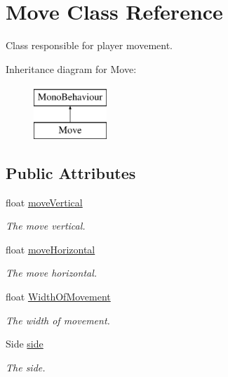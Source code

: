 \hypertarget{class_move}{}\section{Move Class Reference}
\label{class_move}


Class responsible for player movement.  


Inheritance diagram for Move\+:\begin{figure}[H]
\begin{center}
\leavevmode
\includegraphics[height=2.000000cm]{class_move}
\end{center}
\end{figure}
\subsection*{Public Attributes}
\begin{DoxyCompactItemize}
\item 
float \mbox{\hyperlink{class_move_a248dd0919f2777f32c019ca10c342629}{move\+Vertical}}
\begin{DoxyCompactList}\small\item\em The move vertical. \end{DoxyCompactList}\item 
float \mbox{\hyperlink{class_move_a2777ede3b7fbfd425deb04fe8fd69791}{move\+Horizontal}}
\begin{DoxyCompactList}\small\item\em The move horizontal. \end{DoxyCompactList}\item 
float \mbox{\hyperlink{class_move_a564c70756027d119d684db3edfede659}{Width\+Of\+Movement}}
\begin{DoxyCompactList}\small\item\em The width of movement. \end{DoxyCompactList}\item 
Side \mbox{\hyperlink{class_move_a0cf32cb803f7b4783a49ea55c9746dba}{side}}
\begin{DoxyCompactList}\small\item\em The side. \end{DoxyCompactList}\end{DoxyCompactItemize}
